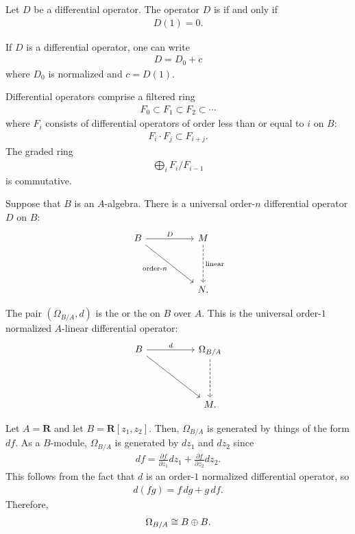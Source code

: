 \documentclass [11 pt, oneside] {article}
\begin{document}
\begin{definition}[ ]\label{}\text{}
	Let $D$ be a differential operator. The operator $D$ is  if and only if 
	\begin{align*}
		D(1)=0.
	\end{align*}
\end{definition}

If $D$ is a differential operator, one can write
\begin{align*}
	D = D_0+c
\end{align*}
where $D_0$ is normalized and $c=D(1)$.

Differential operators comprise a filtered ring
\begin{align*}
	F_0\subset F_1\subset F_2\subset\cdots
\end{align*}
where $F_i$ consists of differential operators of order less than or equal to $i$ on $B$:
\begin{align*}
	F_i\cdot F_j\subset F_{i+j}.
\end{align*}
The graded ring
\begin{align*}
	\bigoplus_{i}F_i/F_{i-1}
\end{align*}
is commutative.

Suppose that $B$ is an $A$-algebra. There is a universal order-$n$ differential operator $D$ on $B$:
\[
\begin{tikzcd}[row sep = 4 em, column sep = 5 em]
	B\ar[r,"D"] \ar[dr, "\textrm{order-$n$}", swap]& M\ar[d,dashed,"\textrm{linear}"] \\
						  & N.
\end{tikzcd}
\]

The pair $(\Omega_{B/A}, d)$ is the  or the  on $B$ over $A$. This is the universal order-$1$ normalized $A$-linear differential operator:
\[
\begin{tikzcd}[row sep = 4 em, column sep = 5 em]
	B\ar[dr]\ar[r,"d"] & \Omega_{B/A}\ar[d,dashed]\\
			   & M.
\end{tikzcd}
\]
\begin{example}[ ]\label{}\text{}
Let $A=\mathbf{R}$ and let $B=\mathbf{R}[z_1,z_2]$. Then, $\Omega_{B/A}$ is generated by things of the form $df$. As a $B$-module, $\Omega_{B/A}$ is generated by $dz_1$ and $dz_2$ since
\begin{align*}
	df = \frac{\partial f}{\partial z_1}dz_1 + \frac{\partial f}{\partial z_2}dz_2.
\end{align*}
This follows from the fact that $d$ is an order-$1$ normalized differential operator, so
\begin{align*}
	d(fg) = f\,{dg} + g\, {df}.
\end{align*}
Therefore,
\begin{align*}
	\Omega_{B/A} \cong B\oplus B.
\end{align*}
\end{example}
\end{document}
